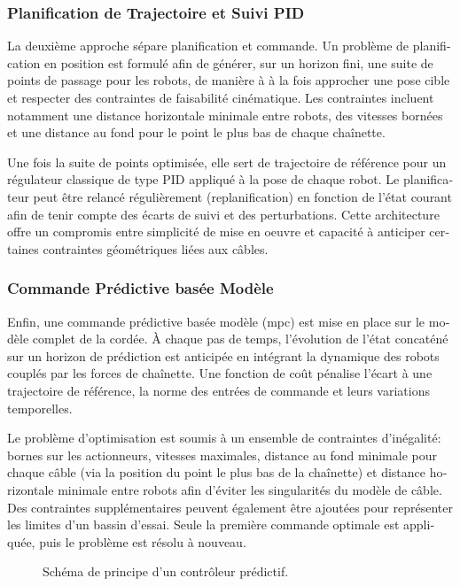 \begin{otherlanguage}{french}
	\subsubsection{Planification de Trajectoire et Suivi PID}

	La deuxième approche sépare planification et commande. Un problème de planification en position est
	formulé afin de générer, sur un horizon fini, une suite de points de passage pour les robots, de
	manière à à la fois approcher une pose cible et respecter des contraintes de faisabilité
	cinématique. Les contraintes incluent notamment une distance horizontale minimale entre robots, des
	vitesses bornées et une distance au fond pour le point le plus bas de chaque chaînette.

	Une fois la suite de points optimisée, elle sert de trajectoire de référence pour un régulateur
	classique de type PID appliqué à la pose de chaque robot. Le planificateur peut être relancé
	régulièrement (replanification) en fonction de l'état courant afin de tenir compte des écarts de
	suivi et des perturbations. Cette architecture offre un compromis entre simplicité de mise en
	oeuvre et capacité à anticiper certaines contraintes géométriques liées aux câbles.

	\subsubsection{Commande Prédictive basée Modèle}

	Enfin, une commande prédictive basée modèle (\acl{mpc}) est mise en place sur le modèle complet de
	la cordée. À chaque pas de temps, l'évolution de l'état concaténé sur un horizon de prédiction est
	anticipée en intégrant la dynamique des robots couplés par les forces de chaînette. Une fonction de
	coût pénalise l'écart à une trajectoire de référence, la norme des entrées de commande et leurs
	variations temporelles.

	Le problème d'optimisation est soumis à un ensemble de contraintes d'inégalité: bornes sur les
	actionneurs, vitesses maximales, distance au fond minimale pour chaque câble (via la position du
	point le plus bas de la chaînette) et distance horizontale minimale entre robots afin d'éviter les
	singularités du modèle de câble. Des contraintes supplémentaires peuvent également être ajoutées
	pour représenter les limites d'un bassin d'essai. Seule la première commande optimale est
	appliquée, puis le problème est résolu à nouveau.

	\begin{figure}
		\centering
		\caption{
			Schéma de principe d'un contrôleur prédictif.
		}
	\end{figure}


\end{otherlanguage}
